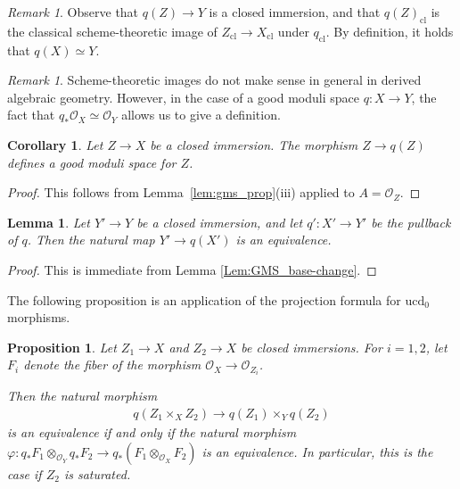 \documentclass[a4paper,twoside,11pt]{amsart}
\theoremstyle{plain}
\newtheorem{lemma}[theorem]{Lemma}
\newtheorem{proposition}[theorem]{Proposition}
\newtheorem{corollary}[theorem]{Corollary}
\theoremstyle{definition}
\theoremstyle{remark}
\newtheorem{remark}[theorem]{Remark}
\numberwithin{equation}{section}
\newcommand{\ucd}{$\mathrm{ucd}_{0}$\xspace}
\newcommand{\cl}{\mathrm{cl}} %
\newcommand{\oO}{\mathcal{O}}
\begin{document}
\begin{remark}
    Observe that $q(Z) \to Y$ is a closed immersion, and that $q(Z)_\cl$ is the classical scheme-theoretic image of $Z_\cl \to X_\cl$ under $q_\cl$. By definition, it holds that $q(X) \simeq Y$.
\end{remark}

\begin{remark}
    Scheme-theoretic images do not make sense in general in derived algebraic geometry. However, in the case of a good moduli space $q \colon X \to Y$, the fact that $q_\ast \oO_X \simeq \oO_Y$ allows us to give a definition.
\end{remark}

\begin{corollary}
    Let $Z \to X$ be a closed immersion. The morphism $Z \to q(Z)$ defines a good moduli space for $Z$.
\end{corollary}

\begin{proof}
    This follows from Lemma~\ref{lem:gms_prop}(iii) applied to $A = \oO_Z$.
\end{proof}

\begin{lemma}
\label{Lem:GMS_image-pull}
    Let $Y' \to Y$ be a closed immersion, and let $q' \colon X' \to Y'$ be the pullback of $q$. Then the natural map $Y' \to q(X')$ is an equivalence.
\end{lemma}

\begin{proof}
    This is immediate from Lemma \ref{Lem:GMS_base-change}.
\end{proof}

The following proposition is an application of the projection formula for \ucd morphisms.

\begin{proposition}
    Let $Z_1 \to X$ and $ Z_2 \to X$ be closed immersions. For $i=1,2$, let $F_i$ denote the fiber of the morphism $\oO_X \to \oO_{Z_i}$.
    
    Then the natural morphism 
    \begin{align} \label{eq: loc 3.8}
        q(Z_1 \times_X Z_2) \to q(Z_1) \times_Y q(Z_2)
    \end{align} 
    is an equivalence if and only if the natural morphism $\varphi \colon q_\ast {F_1} \otimes_{\oO_Y} q_\ast {F_2} \to q_\ast ( {F_1} \otimes_{\oO_X} {F_2} )$ is an equivalence. In particular, this is the case if $Z_2$ is saturated.
\end{proposition}
\end{document}
